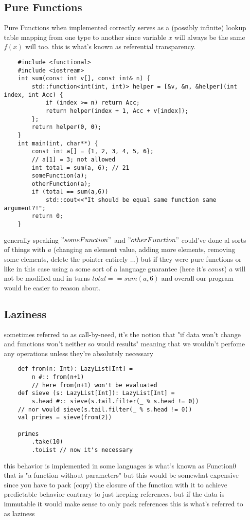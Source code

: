 \documentclass[conference]{IEEEtran}
\begin{document}
\subsection{Pure Functions}
Pure Functions when implemented correctly serves as a (possibly infinite) lookup table mapping from one type to another since variable $x$ will always be the same $f(x)$ will too. this is what's known as referential transparency.
\lstset{style=cpp}
\begin{lstlisting}
    #include <functional>
    #include <iostream>
    int sum(const int v[], const int& n) {
        std::function<int(int, int)> helper = [&v, &n, &helper](int index, int Acc) {
            if (index >= n) return Acc;
            return helper(index + 1, Acc + v[index]);
        };
        return helper(0, 0);
    }
    int main(int, char**) {
        const int a[] = {1, 2, 3, 4, 5, 6};
        // a[1] = 3; not allowed
        int total = sum(a, 6); // 21
        someFunction(a);
        otherFunction(a);
        if (total == sum(a,6))
            std::cout<<"It should be equal same function same argument?!";
        return 0;
    }
\end{lstlisting}
generally speaking $"someFunction"$ and $"otherFunction"$ could've done al sorts of things with $a$ (changing an element value, adding more elements, removing some elements, delete the pointer entirely ...) but if they were pure functions or like in this case using a some sort of a language guarantee (here it's $const$) $a$ will not be modified and in turns $total == sum(a,6)$ and overall our program would be easier to reason about.

\subsection{Laziness}
sometimes referred to as call-by-need, it's the notion that "if data won't change and functions won't neither so would results" meaning that we wouldn't perfome any operations unless they're absolutely necessary 
\lstset{style=scala}
\begin{lstlisting}
    def from(n: Int): LazyList[Int] = 
        n #:: from(n+1) 
        // here from(n+1) won't be evaluated
    def sieve (s: LazyList[Int]): LazyList[Int] = 
        s.head #:: sieve(s.tail.filter(_ % s.head != 0)) 
    // nor would sieve(s.tail.filter(_ % s.head != 0))
    val primes = sieve(from(2))

    primes
        .take(10)
        .toList // now it's necessary

\end{lstlisting}
this behavior is implemented in some languages is what's known as Function0 that is "a function without parameters" but this would be somewhat expensive since you have to pack (copy) the closure
of the function with it to achieve predictable behavior contrary to just keeping references. but if the data is immutable it would make sense to only pack references this is what's referred to as laziness 
\end{document}
